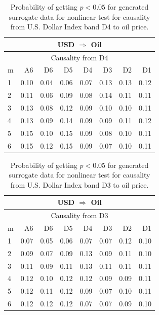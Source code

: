 %
%
\begin{table}[H]
\begin{center}
\begin{tabular}{l|r r r r r r r}
\hline\hline
\multicolumn{8}{c}{USD $\Rightarrow$ Oil}\\
\hline
\multicolumn{8}{c}{Causality from D4}\\
\hline\hline
m & A6 & D6 & D5 & D4 & D3 & D2 & D1 \\
\hline
1 & 0.10 & 0.04 & 0.06 & \cellcolor{mygreen}0.07 & \cellcolor{mygrey}0.13 & 0.13 & 0.12 \\
2 & 0.11 & 0.06 & 0.09 & 0.08 & \cellcolor{mygrey}0.14 & 0.11 & 0.11 \\
3 & 0.13 & 0.08 & 0.12 & 0.09 & \cellcolor{mygrey}0.10 & 0.10 & 0.11 \\
4 & 0.13 & 0.09 & 0.14 & 0.09 & 0.09 & 0.11 & 0.12 \\
5 & 0.15 & 0.10 & 0.15 & 0.09 & 0.08 & 0.10 & 0.11 \\
6 & 0.15 & 0.12 & 0.15 & 0.09 & 0.07 & 0.10 & 0.11 \\
\hline\hline
\end{tabular}
\caption{Probability of getting $p < 0.05$ for generated surrogate data for nonlinear test for causality from U.S. Dollar Index band D4 to oil price.}
\end{center}
\end{table}

%
%
\begin{table}[H]
\begin{center}
\begin{tabular}{l|r r r r r r r}
\hline\hline
\multicolumn{8}{c}{USD $\Rightarrow$ Oil}\\
\hline
\multicolumn{8}{c}{Causality from D3}\\
\hline\hline
m & A6 & D6 & D5 & D4 & D3 & D2 & D1 \\
\hline
1 & 0.07 & 0.05 & 0.06 & 0.07 & 0.07 & 0.12 & 0.10 \\
2 & 0.09 & 0.07 & 0.09 & 0.13 & 0.09 & 0.11 & 0.10 \\
3 & 0.11 & 0.09 & \cellcolor{mygrey}0.11 & 0.13 & 0.11 & 0.11 & 0.11 \\
4 & 0.12 & 0.10 & \cellcolor{mygrey}0.12 & 0.12 & 0.09 & 0.09 & 0.11 \\
5 & 0.12 & 0.11 & \cellcolor{mygrey}0.12 & 0.09 & 0.07 & 0.10 & 0.11 \\
6 & 0.12 & 0.12 & \cellcolor{mygrey}0.12 & 0.07 & 0.07 & 0.09 & 0.10 \\
\hline\hline
\end{tabular}
\caption{Probability of getting $p < 0.05$ for generated surrogate data for nonlinear test for causality from U.S. Dollar Index band D3 to oil price.}
\end{center}
\end{table}

